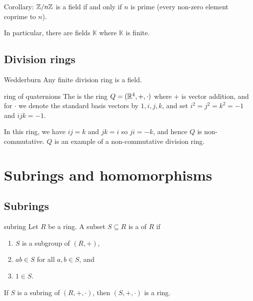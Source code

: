 \documentclass[12pt,letterpaper]{report}
\begin{document}
Corollary: $\mathbb{Z}/{n}\mathbb{Z}$ is a field if and only if $n$ is prime (every non-zero element coprime to
$n$).

In particular, there are fields $\mathbb{K}$ where $\mathbb{K}$ is finite.

\pagebreak
\subsection{Division rings}

\begin{thm}{Wedderburn}{}
  Any finite division ring is a field.
\end{thm}

\begin{defn}{ring of quaternions}{}
  The  is the ring $Q = (\mathbb{R}^4, +, \cdot)$ where $+$ is vector
  addition, and for $\cdot$ we denote the standard basis vectors by $1, i, j, k$, and set
  $i^2 = j^2 = k^2 = -1$ and $ijk = -1$.
\end{defn}

In this ring, we have $ij = k$ and $jk = i$ so $ji = -k$, and hence $Q$ is non-commutative.
$Q$ is an example of a non-commutative division ring.

\section{Subrings and homomorphisms}

\subsection{Subrings}

\begin{defn}{subring}{}
  Let $R$ be a ring.
  A subset $S \subseteq R$ is a  of $R$ if
  \begin{enumerate}
    \item $S$ is a subgroup of $(R, +)$,
    \item $ab \in S$ for all $a, b \in S$, and
    \item $1 \in S$.
  \end{enumerate}
\end{defn}

\begin{lem}{}{}
  If $S$ is a subring of $(R, +, \cdot)$, then $(S, +, \cdot)$ is a ring.
\end{lem}
\end{document}
